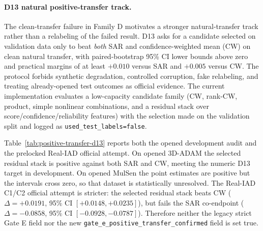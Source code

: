 \documentclass[10pt,conference]{IEEEtran}
\begin{document}
\begin{table}[t]
\centering
\caption{RGA-gated-CW on held-out external 3D-ADAM: the gate defaults to
confidence-weighting (CW) and switches only under validation-calibrated
drift. It equals CW on clean ($\alpha=0$), is statistically unresolved at
$\alpha=0.25$, and significantly improves over CW from $\alpha\ge0.5$.}
\label{tab:rga-gated-cw}
\end{table}

\paragraph{D13 natural positive-transfer track.}
The clean-transfer failure in Family D motivates a stronger natural-transfer
track rather than a relabeling of the failed result. D13 asks for a candidate
selected on validation data only to beat \emph{both} SAR and confidence-weighted
mean (CW) on clean natural transfer, with paired-bootstrap 95\% CI lower bounds
above zero and practical margins of at least $+0.010$ versus SAR and $+0.005$
versus CW. The protocol forbids synthetic degradation, controlled corruption,
fake relabeling, and treating already-opened test outcomes as official
evidence. The current implementation evaluates a low-capacity candidate family
(CW, rank-CW, product, simple nonlinear combinations, and a residual stack over
score/confidence/reliability features) with the selection made on the
validation split and logged as \texttt{used\_test\_labels=false}.

Table~\ref{tab:positive-transfer-d13} reports both the opened development
audit and the prelocked Real-IAD official attempt. On opened 3D-ADAM the selected
residual stack is positive against both SAR and CW, meeting the numeric D13
target in development. On opened MulSen the point estimates are positive but
the intervals cross zero, so that dataset is statistically unresolved. The
Real-IAD C1/C2 official attempt is stricter: the selected residual stack
beats CW ($\Delta=+0.0191$, 95\% CI $[+0.0148,+0.0235]$), but fails the SAR
co-endpoint ($\Delta=-0.0858$, 95\% CI $[-0.0928,-0.0787]$). Therefore neither
the legacy strict Gate E field nor the new
\texttt{gate\_e\_positive\_transfer\_confirmed} field is set true.

\begin{table}[t]
\centering
\caption{D13 natural clean positive-transfer audit. The target is to beat both
SAR and confidence-weighted mean (CW) without synthetic degradation. Opened
development rows cannot set Gate E; official rows still require both
co-endpoints to pass.}
\label{tab:positive-transfer-d13}
\footnotesize
{}
\end{table}
\end{document}
